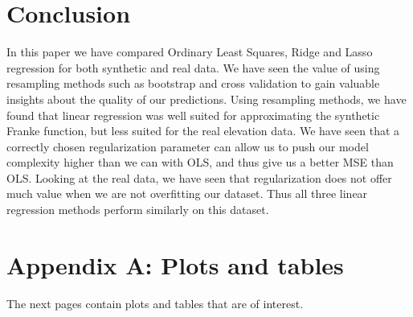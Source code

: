 \documentclass[twocolumn,10pt,cleanfoot]{asme2ej}
\begin{document}
\section{Conclusion}

In this paper we have compared Ordinary Least Squares, Ridge and Lasso regression for both synthetic and real data. We have seen the value of using resampling methods such as bootstrap and cross validation to gain valuable insights about the quality of our predictions. Using resampling methods, we have found that linear regression was well suited for approximating the synthetic Franke function, but less suited for the real elevation data. We have seen that a correctly chosen regularization parameter can allow us to push our model complexity higher than we can with OLS, and thus give us a better MSE than OLS. Looking at the real data, we have seen that regularization does not offer much value when we are not overfitting our dataset. Thus all three linear regression methods perform similarly on this dataset. 




\section*{Appendix A: Plots and tables}

The next pages contain plots and tables that are of interest.
\end{document}
